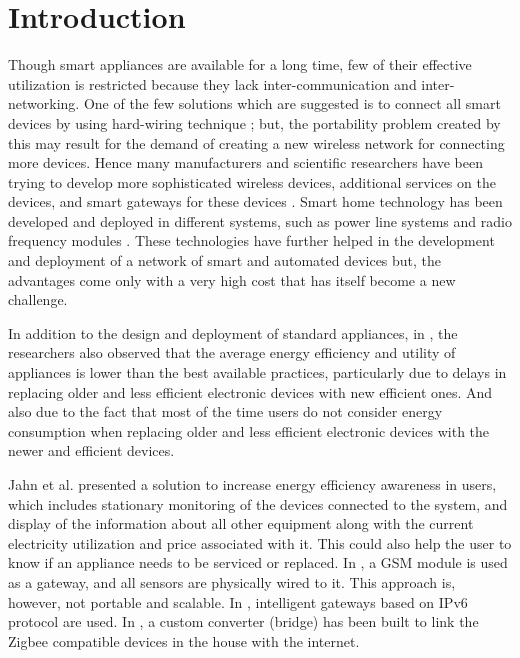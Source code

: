 \section{Introduction}
\label{intro}
Though smart appliances are available for a long time, few of their effective utilization is restricted because they lack inter-communication and inter-networking. One of the few solutions which are suggested is to connect all smart devices by using hard-wiring technique \cite{1}; but, the portability problem created by this may result for the demand of creating a new wireless network for connecting more devices. Hence many manufacturers and scientific researchers have been trying to develop more sophisticated wireless devices, additional services on the devices, and smart gateways for these devices \cite{2}. Smart home technology has been developed and deployed in different systems, such as power line systems and radio frequency modules \cite{3}. These technologies have further helped in the development and deployment of a network of smart and automated devices but, the advantages come only with a very high cost that has itself become a new challenge.

In addition to the design and deployment of standard appliances, in \cite{4}, the researchers also observed that the average energy efficiency and utility of appliances is lower than the best available practices, particularly due to delays in replacing older and less efficient electronic devices with new efficient ones. And also due to the fact that most of the time users do not consider energy consumption when replacing older and less efficient electronic devices with the newer and efficient devices.

Jahn et al. \cite{4} presented a solution to increase energy efficiency awareness in users, which includes stationary monitoring of the devices connected to the system, and display of the information about all other equipment along with the current electricity utilization and price associated with it. This could also help the user to know if an appliance needs to be serviced or replaced. In \cite{6}, a GSM module is used as a gateway, and all sensors are physically wired to it. This approach is, however, not portable and scalable. In \cite{7}, intelligent gateways based on IPv6 protocol are used. In \cite{8}, a custom converter (bridge) has been built to link the Zigbee compatible devices in the house with the internet.

